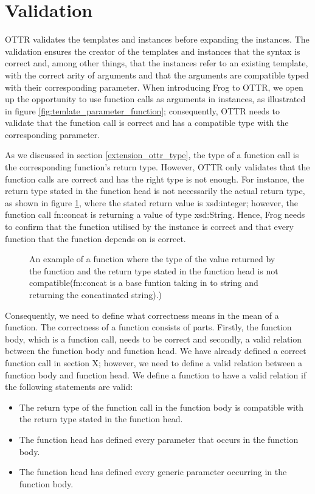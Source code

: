 \section{Validation}
OTTR validates the templates and instances before expanding the instances. The validation ensures the creator of the templates and instances that the syntax is correct and, among other things, that the instances refer to an existing template, with the correct arity of arguments and that the arguments are compatible typed with their corresponding parameter. When introducing Frog to OTTR, we open up the opportunity to use function calls as arguments in instances, as illustrated in figure \ref{fig:temlate_parameter_function}; consequently, OTTR needs to validate that the function call is correct and has a compatible type with the corresponding parameter. 

\para
As we discussed in section \ref{extension_ottr_type}, the type of a function call is the corresponding function's return type. However, OTTR only validates that the function calls are correct and has the right type is not enough. For instance, the return type stated in the function head is not necessarily the actual return type, as shown in figure \ref{fig:wrong_function}, where the stated return value is xsd:integer; however, the function call fn:concat is returning a value of type xsd:String. Hence, Frog needs to confirm that the function utilised by the instance is correct and that every function that the function depends on is correct.

\begin{figure}
    \centering
    
    \caption{An example of a function where the type of the value returned by the function and the return type stated in the function head is not compatible(fn:concat is a base funtion taking in to string and returning the concatinated string).)}
    \label{fig:wrong_function}
\end{figure}

\para
Consequently, we need to define what correctness means in the mean of a function. The correctness of a function consists of parts. Firstly, the function body, which is a function call, needs to be correct and secondly, a valid relation between the function body and function head. We have already defined a correct function call in section X; however, we need to define a valid relation between a function body and function head. We define a function to have a valid relation if the following statements are valid:
\begin{itemize}
    \item The return type of the function call in the function body is compatible with the return type stated in the function head. 
    \item The function head has defined every parameter that occurs in the function body.
    \item The function head has defined every generic parameter occurring in the function body.
\end{itemize} 

